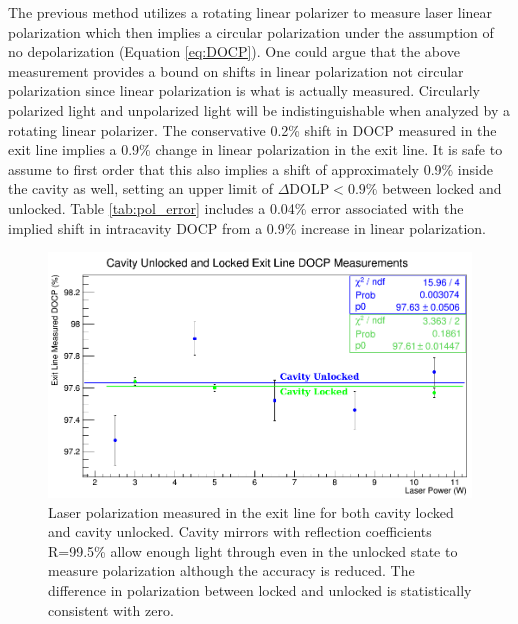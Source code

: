 The previous method utilizes a rotating linear polarizer to measure laser linear polarization which then implies a circular polarization under the assumption of no depolarization (Equation \ref{eq:DOCP}). One could argue that the above measurement provides a bound on shifts in linear polarization not circular polarization since linear polarization is what is actually measured. Circularly polarized light and unpolarized light will be indistinguishable when analyzed by a rotating linear polarizer. The conservative 0.2\% shift in DOCP measured in the exit line implies a 0.9\% change in linear polarization in the exit line. It is safe to assume to first order that this also implies a shift of approximately 0.9\% inside the cavity as well, setting an upper limit of $\Delta$DOLP$<0.9\%$ between locked and unlocked. Table \ref{tab:pol_error} includes a 0.04\% error associated with the implied shift in intracavity DOCP from a 0.9\% increase in linear polarization.

\begin{figure}[ht]
\begin{center}
\includegraphics[width=5.0in]{./Pictures/UnlockedPolChange.png}
\caption{\label{fig:pol_change}Laser polarization measured in the exit line for both cavity locked and cavity unlocked. Cavity mirrors with reflection coefficients R=99.5\% allow enough light through even in the unlocked state to measure polarization although the accuracy is reduced. The difference in polarization between locked and unlocked is statistically consistent with zero.}
\end{center}
\end{figure}

